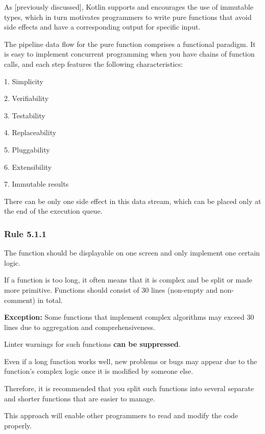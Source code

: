 {{{{As [previously discussed], Kotlin supports and encourages the use of immutable types, which in turn motivates programmers to write pure functions that avoid side effects and have a corresponding output for specific input.

The pipeline data flow for the pure function comprises a functional paradigm. It is easy to implement concurrent programming when you have chains of function calls, and each step features the following characteristics:

1.	Simplicity

2.	Verifiability

3.	Testability

4.	Replaceability

5.	Pluggability

6.	Extensibility

7.	Immutable results



There can be only one side effect in this data stream, which can be placed only at the end of the execution queue.



\subsubsection*{\textbf{Rule 5.1.1}}
\leavevmode\newline



The function should be displayable on one screen and only implement one certain logic.

If a function is too long, it often means that it is complex and be split or made more primitive. Functions should consist of 30 lines (non-empty and non-comment) in total.



\textbf{Exception:} Some functions that implement complex algorithms may exceed 30 lines due to aggregation and comprehensiveness.

Linter warnings for such functions \textbf{can be suppressed}.



Even if a long function works well, new problems or bugs may appear due to the function's complex logic once it is modified by someone else.

Therefore, it is recommended that you split such functions into several separate and shorter functions that are easier to manage.

This approach will enable other programmers to read and modify the code properly.

}}}}
